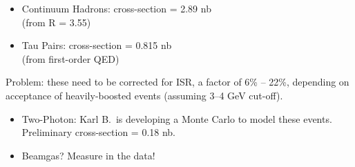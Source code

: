 

\begin{slide*}

\slideframe{}
\huge
{}

\begin{minipage}[t]{\linewidth}
\LARGE

\vspace{1 cm}

\begin{flushleft}
\begin{itemize}
  \item Continuum Hadrons: cross-section = 2.89 nb \\ \hspace{0.5 cm} (from R = 3.55)
  \item Tau Pairs: cross-section = 0.815 nb \\ \hspace{0.5 cm} (from first-order QED)
\end{itemize}
\end{flushleft}

\vspace{1 cm}

Problem: these need to be corrected for ISR, a factor of 6\% -- 22\%,
depending on acceptance of heavily-boosted events (assuming 3--4 GeV
cut-off).

\vspace{1 cm}

\begin{flushleft}
\begin{itemize}
  \item Two-Photon: Karl B.\ is developing a Monte Carlo to model
  these events. Preliminary cross-section = 0.18 nb.
  \item Beamgas? Measure in the data!
\end{itemize}
\end{flushleft}



\end{minipage}

\end{slide*}


